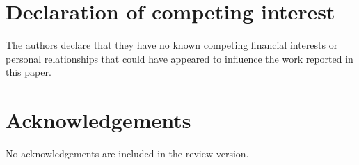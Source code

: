 \section*{Declaration of competing interest}

The authors declare that they have no known competing financial interests or personal relationships that could have appeared to influence the work reported in this paper.

\section*{Acknowledgements}

No acknowledgements are included in the review version.
